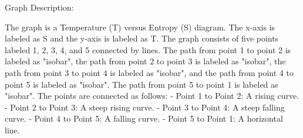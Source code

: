Graph Description:

The graph is a Temperature (T) versus Entropy (S) diagram. The x-axis is labeled as S and the y-axis is labeled as T. The graph consists of five points labeled 1, 2, 3, 4, and 5 connected by lines. The path from point 1 to point 2 is labeled as "isobar", the path from point 2 to point 3 is labeled as "isobar", the path from point 3 to point 4 is labeled as "isobar", and the path from point 4 to point 5 is labeled as "isobar". The path from point 5 to point 1 is labeled as "isobar". The points are connected as follows:
- Point 1 to Point 2: A rising curve.
- Point 2 to Point 3: A steep rising curve.
- Point 3 to Point 4: A steep falling curve.
- Point 4 to Point 5: A falling curve.
- Point 5 to Point 1: A horizontal line.